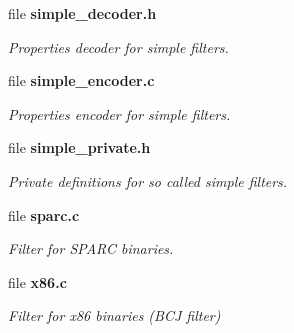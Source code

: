\begin{DoxyCompactItemize}
file \textbf{ simple\+\_\+decoder.\+h}
\begin{DoxyCompactList}\small\item\em Properties decoder for simple filters. \end{DoxyCompactList}\item 
file \textbf{ simple\+\_\+encoder.\+c}
\begin{DoxyCompactList}\small\item\em Properties encoder for simple filters. \end{DoxyCompactList}\item 
file \textbf{ simple\+\_\+private.\+h}
\begin{DoxyCompactList}\small\item\em Private definitions for so called simple filters. \end{DoxyCompactList}\item 
file \textbf{ sparc.\+c}
\begin{DoxyCompactList}\small\item\em Filter for S\+P\+A\+RC binaries. \end{DoxyCompactList}\item 
file \textbf{ x86.\+c}
\begin{DoxyCompactList}\small\item\em Filter for x86 binaries (B\+CJ filter) \end{DoxyCompactList}\end{DoxyCompactItemize}
